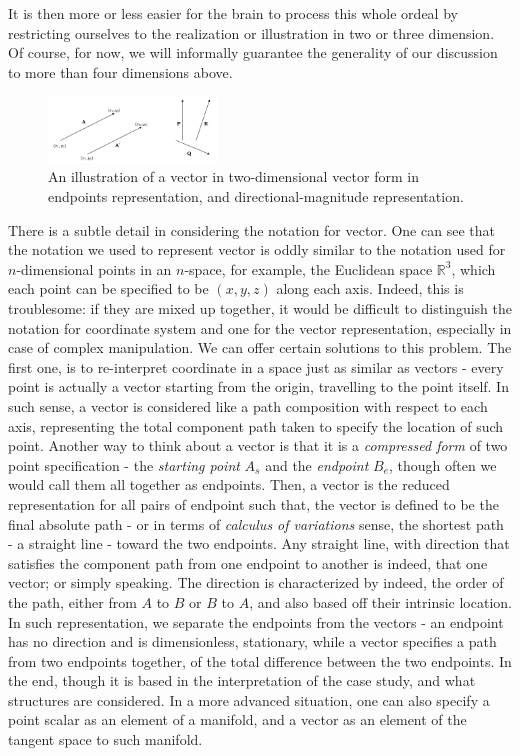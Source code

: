 It is then more or less easier for the brain to process this whole ordeal by restricting ourselves to the realization or illustration in two or three dimension. Of course, for now, we will informally guarantee the generality of our discussion to more than four dimensions above. 
\begin{figure}[h!]
    \centering
    \includegraphics[width=0.4\textwidth]{img/vector1.png}
    \caption{An illustration of a vector in two-dimensional vector form in endpoints representation, and directional-magnitude representation.}
\end{figure}

There is a subtle detail in considering the notation for vector. One can see that the notation we used to represent vector is oddly similar to the notation used for $n$-dimensional points in an $n$-space, for example, the Euclidean space $\mathbb{R}^{3}$, which each point can be specified to be $(x,y,z)$ along each axis. Indeed, this is troublesome: if they are mixed up together, it would be difficult to distinguish the notation for coordinate system and one for the vector representation, especially in case of complex manipulation. We can offer certain solutions to this problem. The first one, is to re-interpret coordinate in a space just as similar as vectors - every point is actually a vector starting from the origin, travelling to the point itself. In such sense, a vector is considered like a path composition with respect to each axis, representing the total component path taken to specify the location of such point. Another way to think about a vector is that it is a \textit{compressed form} of two point specification - the \textit{starting point} $A_{s}$ and the \textit{endpoint} $B_{e}$, though often we would call them all together as endpoints. Then, a vector is the reduced representation for all pairs of endpoint such that, the vector is defined to be the final absolute path - or in terms of \textit{calculus of variations} sense, the shortest path - a straight line - toward the two endpoints. Any straight line, with direction that satisfies the component path from one endpoint to another is indeed, that one vector; or simply speaking. The direction is characterized by indeed, the order of the path, either from $A$ to $B$ or $B$ to $A$, and also based off their intrinsic location. In such representation, we separate the endpoints from the vectors - an endpoint has no direction and is dimensionless, stationary, while a vector specifies a path from two endpoints together, of the total difference between the two endpoints. In the end, though it is based in the interpretation of the case study, and what structures are considered. In a more advanced situation, one can also specify a point scalar as an element of a manifold, and a vector as an element of the tangent space to such manifold. 

